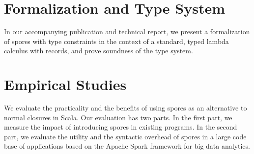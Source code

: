 \documentclass[english]{lni}
\begin{document}






\vspace{-7mm}
\section{Formalization and Type System}
\vspace{-5mm}
In our accompanying publication and technical report,
we present a formalization of spores with type constraints in the context of a
standard, typed lambda calculus with records, and prove soundness of the type
system.

\vspace{-7mm}
\section{Empirical Studies}
\vspace{-5mm}
We evaluate the practicality and the benefits of using spores as an
alternative to normal closures in Scala. Our evaluation has two parts. In the
first part, we measure the impact of introducing spores in existing programs.
In the second part, we evaluate the utility and the syntactic overhead of
spores in a large code base of applications based on the Apache Spark
framework for big data analytics.
\end{document}
